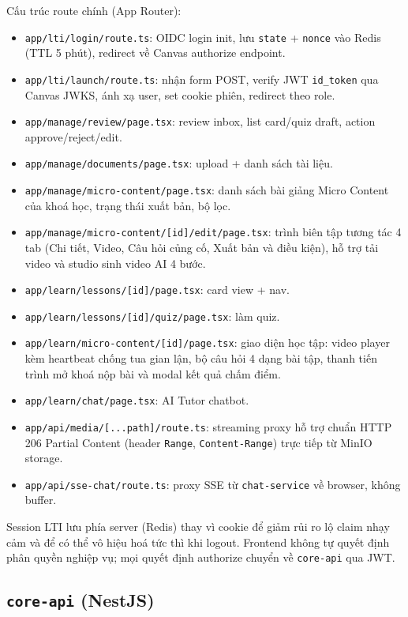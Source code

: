 Cấu trúc route chính (App Router):

\begin{itemize}
    \item \texttt{app/lti/login/route.ts}: OIDC login init, lưu
          \texttt{state} + \texttt{nonce} vào Redis (TTL 5 phút), redirect
          về Canvas authorize endpoint.
    \item \texttt{app/lti/launch/route.ts}: nhận form POST, verify JWT
          \texttt{id\_token} qua Canvas JWKS, ánh xạ user, set cookie
          phiên, redirect theo role.
    \item \texttt{app/manage/review/page.tsx}: review inbox, list card/quiz
          draft, action approve/reject/edit.
    \item \texttt{app/manage/documents/page.tsx}: upload + danh sách tài liệu.
    \item \texttt{app/manage/micro-content/page.tsx}: danh sách bài giảng Micro Content của khoá học, trạng thái xuất bản, bộ lọc.
    \item \texttt{app/manage/micro-content/[id]/edit/page.tsx}: trình biên tập tương tác 4 tab (Chi tiết, Video, Câu hỏi củng cố, Xuất bản và điều kiện), hỗ trợ tải video và studio sinh video AI 4 bước.
    \item \texttt{app/learn/lessons/[id]/page.tsx}: card view + nav.
    \item \texttt{app/learn/lessons/[id]/quiz/page.tsx}: làm quiz.
    \item \texttt{app/learn/micro-content/[id]/page.tsx}: giao diện học tập: video player kèm heartbeat chống tua gian lận, bộ câu hỏi 4 dạng bài tập, thanh tiến trình mở khoá nộp bài và modal kết quả chấm điểm.
    \item \texttt{app/learn/chat/page.tsx}: AI Tutor chatbot.
    \item \texttt{app/api/media/[...path]/route.ts}: streaming proxy hỗ trợ chuẩn HTTP 206 Partial Content (header \texttt{Range}, \texttt{Content-Range}) trực tiếp từ MinIO storage.
    \item \texttt{app/api/sse-chat/route.ts}: proxy SSE từ
          \texttt{chat-service} về browser, không buffer.
\end{itemize}

Session LTI lưu phía server (Redis) thay vì cookie để giảm rủi ro lộ
claim nhạy cảm và để có thể vô hiệu hoá tức thì khi logout. Frontend
không tự quyết định phân quyền nghiệp vụ; mọi quyết định authorize
chuyển về \texttt{core-api} qua JWT.

\subsection{\texttt{core-api} (NestJS)}

